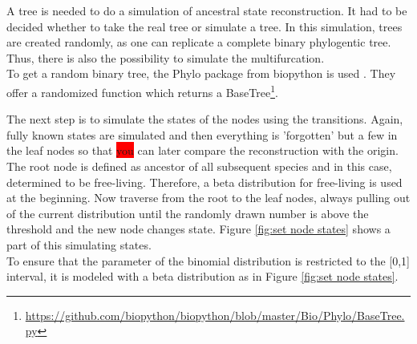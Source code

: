     A tree is needed to do a simulation of ancestral state reconstruction. It had to be decided whether 
      to take the real tree or simulate a tree. In this simulation, trees are created randomly, as 
      one can replicate a complete binary phylogentic tree. Thus, there is also the possibility to 
      simulate the multifurcation. \\
    To get a random binary tree, the Phylo package from biopython is used \cite{Cock2009}. They offer 
      a randomized function which returns a BaseTree\footnote{
        \hyperlink{https://github.com/biopython/biopython/blob/master/Bio/Phylo/BaseTree.py}
        {https://github.com/biopython/biopython/blob/master/Bio/Phylo/BaseTree.py}
      }. \\

    The next step is to simulate the states of the nodes using the transitions. Again, fully known 
      states are simulated and then everything is 'forgotten' but a few in the leaf nodes so that 
      \colorbox{red}{you} can later compare the reconstruction with the origin. \\
    The root node is defined as ancestor of all subsequent species and in this case, determined to be
      free-living. Therefore, a beta distribution for free-living is used at the beginning. Now 
      traverse from the root to the leaf nodes, always pulling out of the current distribution until 
      the randomly drawn number is above the threshold and the new node changes state. Figure 
      \ref{fig:set node states} shows a part of this simulating states. \\
    To ensure that the parameter of the binomial distribution is restricted to the [0,1] interval, it 
      is modeled with a beta distribution as in Figure \ref{fig:set node states}. \\

